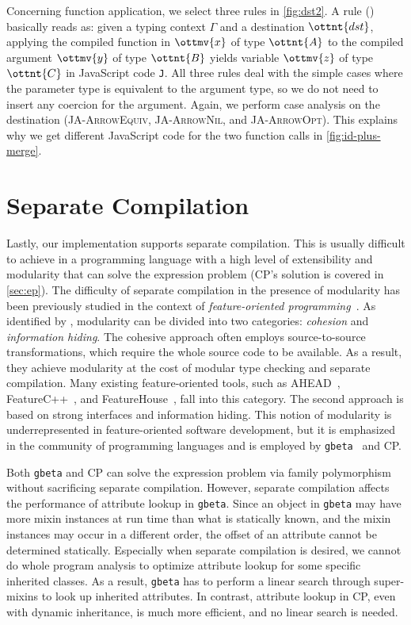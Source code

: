 Concerning function application, we select three rules in \autoref{fig:dst2}. A
rule (\application) basically reads as: given a typing context $\Gamma$ and a
destination $\ottnt{dst}$, applying the compiled function in $\ottmv{x}$ of type
$\ottnt{A}$ to the compiled argument $\ottmv{y}$ of type $\ottnt{B}$ yields variable
$\ottmv{z}$ of type $\ottnt{C}$ in JavaScript code \texttt{J}. All three rules deal
with the simple cases where the parameter type is equivalent to the argument
type, so we do not need to insert any coercion for the argument. Again, we
perform case analysis on the destination (\textsc{JA-ArrowEquiv},
\textsc{JA-ArrowNil}, and \textsc{JA-ArrowOpt}). This explains why we get
different JavaScript code for the two function calls in
\autoref{fig:id-plus-merge}.

\section{Separate Compilation} \label{sec:separate}

Lastly, our implementation supports separate compilation. This is usually
difficult to achieve in a programming language with a high level of
extensibility and modularity that can solve the expression problem (CP's
solution is covered in \autoref{sec:ep}). The difficulty of separate compilation
in the presence of modularity has been previously studied in the context of
\emph{feature-oriented
programming}~\citep{prehofer1997feature,apel2009overview}. As identified by
\citet{kastner2011road}, modularity can be divided into two categories:
\emph{cohesion} and \emph{information hiding}. The cohesive approach often
employs source-to-source transformations, which require the whole source code to
be available. As a result, they achieve modularity at the cost of modular type
checking and separate compilation. Many existing feature-oriented tools, such as
AHEAD~\citep{batory2004scaling}, FeatureC++~\citep{apel2005featurec++}, and
FeatureHouse~\citep{apel2013language}, fall into this category. The second
approach is based on strong interfaces and information hiding. This notion of
modularity is underrepresented in feature-oriented software development, but it
is emphasized in the community of programming languages and is employed by
\texttt{gbeta}~\citep{ernst2000gbeta} and CP.

Both \texttt{gbeta} and CP can solve the expression problem via family
polymorphism~\citep{ernst2004expression} without sacrificing separate
compilation. However, separate compilation affects the performance of attribute
lookup in \texttt{gbeta}. Since an object in \texttt{gbeta} may have more mixin
instances at run time than what is statically known, and the mixin instances may
occur in a different order, the offset of an attribute cannot be determined
statically. Especially when separate compilation is desired, we cannot do whole
program analysis to optimize attribute lookup for some specific inherited
classes. As a result, \texttt{gbeta} has to perform a linear search through
super-mixins to look up inherited attributes. In contrast, attribute lookup in
CP, even with dynamic inheritance, is much more efficient, and no linear search
is needed.

